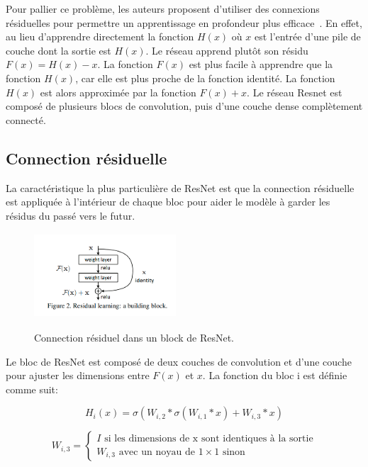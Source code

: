 \documentclass{article}
\begin{document}
Pour pallier ce problème, les auteurs proposent d'utiliser des connexions résiduelles pour permettre un apprentissage en
profondeur plus efficace~\cite{resnet}. En effet, au lieu d'apprendre directement la fonction $H(x)$ où $x$ est l'entrée d'une pile
de couche dont la sortie est $H(x)$. Le réseau apprend
plutôt son résidu $F(x) = H(x) - x$. La fonction $F(x)$ est plus facile à apprendre que la fonction $H(x)$, car elle est
plus proche de la fonction identité. La fonction $H(x)$ est alors approximée par la fonction $F(x) + x$.
Le réseau Resnet est composé de plusieurs blocs de convolution, puis d'une couche dense complètement connecté.

\subsection{Connection résiduelle}
La caractéristique la plus particulière de ResNet est que la connection résiduelle est appliquée à l'intérieur de chaque bloc
pour aider le modèle à garder les résidus du passé vers le futur.

\begin{figure}[h]
    \centering
    \includegraphics[width=150pt,height=90pt]{./img/skip}
    \caption{Connection résiduel dans un block de ResNet.}\cite{resnet}\label{fig: skip}
\end{figure}

Le bloc de ResNet est composé de deux couches de convolution et d'une couche pour ajuster les dimensions entre $F(x)$ et $x$.
La fonction du bloc i est définie comme suit:

\begin{equation}
    H_i(x) = \sigma(W_{i,2} * \sigma(W_{i,1} * x) + W_{i,3} * x)
\end{equation}

\begin{equation}
    W_{i, 3} =
    \begin{cases}
        I \text{ si les dimensions de x sont identiques à la sortie} \\
        W_{i, 3}\text{ avec un noyau de } 1\times1 \text{ sinon}
    \end{cases}
\end{equation}
\end{document}
